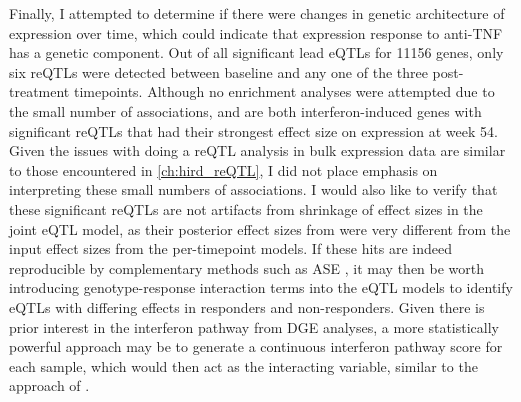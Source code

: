 Finally, I attempted to determine if there were changes in genetic architecture of expression over time,
which could indicate that expression response to anti-\gls{TNF} has a genetic component.
Out of all significant lead \glspl{eQTL} for \num{11156} genes, only six \glspl{reQTL} were detected between baseline and any one of the three post-treatment timepoints.
Although no enrichment analyses were attempted due to the small number of associations, 
 and  are both interferon-induced genes with significant \glspl{reQTL} that had their strongest effect size on expression at week 54.
Given the issues with doing a \gls{reQTL} analysis in bulk expression data are similar to those encountered in \cref{ch:hird_reQTL},
I did not place emphasis on interpreting these small numbers of associations.
I would also like to verify that these significant \glspl{reQTL} are not artifacts from shrinkage of effect sizes in the joint \gls{eQTL} model,
as their posterior effect sizes from  were very different from the input effect sizes from the per-timepoint models.
If these hits are indeed reproducible by complementary methods such as \gls{ASE} \autocite{gutierrez-arcelus2020AllelespecificExpressionChanges},
it may then be worth introducing genotype-response interaction terms into the \gls{eQTL} models
to identify \glspl{eQTL} with differing effects in responders and non-responders.
Given there is prior interest in the interferon pathway from \gls{DGE} analyses,
a more statistically powerful approach may be to generate a continuous interferon pathway score for each sample,
which would then act as the interacting variable,
similar to the approach of \textcite{davenport2018DiscoveringVivoCytokineeQTL}.

